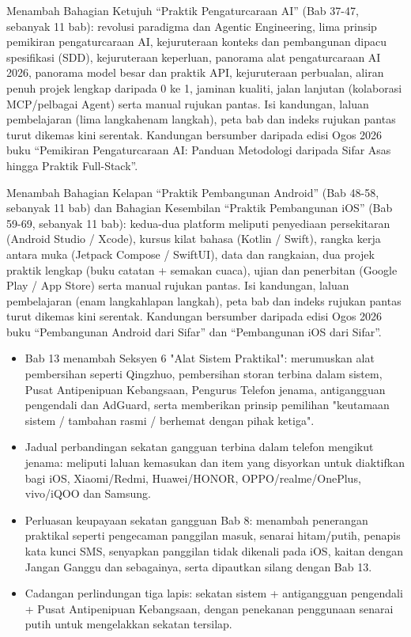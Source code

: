 Menambah Bahagian Ketujuh “Praktik Pengaturcaraan AI” (Bab 37-47, sebanyak 11 bab): revolusi paradigma dan Agentic Engineering, lima prinsip pemikiran pengaturcaraan AI, kejuruteraan konteks dan pembangunan dipacu spesifikasi (SDD), kejuruteraan keperluan, panorama alat pengaturcaraan AI 2026, panorama model besar dan praktik API, kejuruteraan perbualan, aliran penuh projek lengkap daripada 0 ke 1, jaminan kualiti, jalan lanjutan (kolaborasi MCP/pelbagai Agent) serta manual rujukan pantas. Isi kandungan, laluan pembelajaran (lima langkahenam langkah), peta bab dan indeks rujukan pantas turut dikemas kini serentak. Kandungan bersumber daripada edisi Ogos 2026 buku “Pemikiran Pengaturcaraan AI: Panduan Metodologi daripada Sifar Asas hingga Praktik Full-Stack”.

Menambah Bahagian Kelapan “Praktik Pembangunan Android” (Bab 48-58, sebanyak 11 bab) dan Bahagian Kesembilan “Praktik Pembangunan iOS” (Bab 59-69, sebanyak 11 bab): kedua-dua platform meliputi penyediaan persekitaran (Android Studio / Xcode), kursus kilat bahasa (Kotlin / Swift), rangka kerja antara muka (Jetpack Compose / SwiftUI), data dan rangkaian, dua projek praktik lengkap (buku catatan + semakan cuaca), ujian dan penerbitan (Google Play / App Store) serta manual rujukan pantas. Isi kandungan, laluan pembelajaran (enam langkahlapan langkah), peta bab dan indeks rujukan pantas turut dikemas kini serentak. Kandungan bersumber daripada edisi Ogos 2026 buku “Pembangunan Android dari Sifar” dan “Pembangunan iOS dari Sifar”.


\begin{itemize}
  \item Bab 13 menambah Seksyen 6 "Alat Sistem Praktikal": merumuskan alat pembersihan seperti Qingzhuo, pembersihan storan terbina dalam sistem, Pusat Antipenipuan Kebangsaan, Pengurus Telefon jenama, antigangguan pengendali dan AdGuard, serta memberikan prinsip pemilihan "keutamaan sistem / tambahan rasmi / berhemat dengan pihak ketiga".
  \item Jadual perbandingan sekatan gangguan terbina dalam telefon mengikut jenama: meliputi laluan kemasukan dan item yang disyorkan untuk diaktifkan bagi iOS, Xiaomi/Redmi, Huawei/HONOR, OPPO/realme/OnePlus, vivo/iQOO dan Samsung.
  \item Perluasan keupayaan sekatan gangguan Bab 8: menambah penerangan praktikal seperti pengecaman panggilan masuk, senarai hitam/putih, penapis kata kunci SMS, senyapkan panggilan tidak dikenali pada iOS, kaitan dengan Jangan Ganggu dan sebagainya, serta dipautkan silang dengan Bab 13.
  \item Cadangan perlindungan tiga lapis: sekatan sistem + antigangguan pengendali + Pusat Antipenipuan Kebangsaan, dengan penekanan penggunaan senarai putih untuk mengelakkan sekatan tersilap.
\end{itemize}


